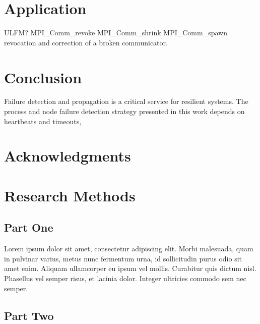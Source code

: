 \documentclass[sigconf]{acmart}
\begin{document}
\section{Application}
ULFM?
MPI_Comm_revoke
MPI_Comm_shrink
MPI_Comm_spawn  revocation and correction of a broken communicator.

\section{Conclusion}
Failure detection and propagation is a critical service for resilient systems. The process and node failure detection strategy presented in this work depends on heartbeats and timeouts, 

\section{Acknowledgments}

%
\begin{acks}
\end{acks}

%



% 
\appendix

\section{Research Methods}

\subsection{Part One}

Lorem ipsum dolor sit amet, consectetur adipiscing elit. Morbi malesuada, quam in pulvinar varius, metus nunc fermentum urna, id sollicitudin purus odio sit amet enim. Aliquam ullamcorper eu ipsum vel mollis. Curabitur quis dictum nisl. Phasellus vel semper risus, et lacinia dolor. Integer ultricies commodo sem nec semper. 

\subsection{Part Two}
\end{document}
